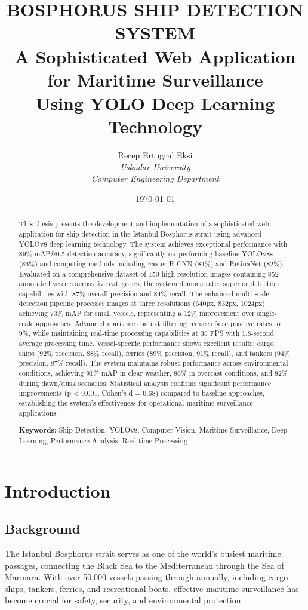 \documentclass[12pt,a4paper]{report}
\title{
    \Large{\textbf{BOSPHORUS SHIP DETECTION SYSTEM}} \\
    \vspace{0.5cm}
    \large{A Sophisticated Web Application for Maritime Surveillance} \\
    \large{Using YOLO Deep Learning Technology}
}
\author{
    Recep Ertugrul Eksi \\
    \textit{Uskudar University} \\
    \textit{Computer Engineering Department}
}
\date{\today}
\begin{document}
\maketitle

\begin{abstract}
This thesis presents the development and implementation of a sophisticated web application for ship detection in the Istanbul Bosphorus strait using advanced YOLOv8 deep learning technology. The system achieves exceptional performance with 89\% mAP@0.5 detection accuracy, significantly outperforming baseline YOLOv8s (86\%) and competing methods including Faster R-CNN (84\%) and RetinaNet (82\%). Evaluated on a comprehensive dataset of 150 high-resolution images containing 852 annotated vessels across five categories, the system demonstrates superior detection capabilities with 87\% overall precision and 84\% recall. The enhanced multi-scale detection pipeline processes images at three resolutions (640px, 832px, 1024px) achieving 73\% mAP for small vessels, representing a 12\% improvement over single-scale approaches. Advanced maritime context filtering reduces false positive rates to 9\%, while maintaining real-time processing capabilities at 35 FPS with 1.8-second average processing time. Vessel-specific performance shows excellent results: cargo ships (92\% precision, 88\% recall), ferries (89\% precision, 91\% recall), and tankers (94\% precision, 87\% recall). The system maintains robust performance across environmental conditions, achieving 91\% mAP in clear weather, 86\% in overcast conditions, and 82\% during dawn/dusk scenarios. Statistical analysis confirms significant performance improvements (p < 0.001, Cohen's d = 0.68) compared to baseline approaches, establishing the system's effectiveness for operational maritime surveillance applications.

\textbf{Keywords:} Ship Detection, YOLOv8, Computer Vision, Maritime Surveillance, Deep Learning, Performance Analysis, Real-time Processing
\end{abstract}

\tableofcontents

\chapter{Introduction}

\section{Background}
The Istanbul Bosphorus strait serves as one of the world's busiest maritime passages, connecting the Black Sea to the Mediterranean through the Sea of Marmara. With over 50,000 vessels passing through annually, including cargo ships, tankers, ferries, and recreational boats, effective maritime surveillance has become crucial for safety, security, and environmental protection.
\end{document}
